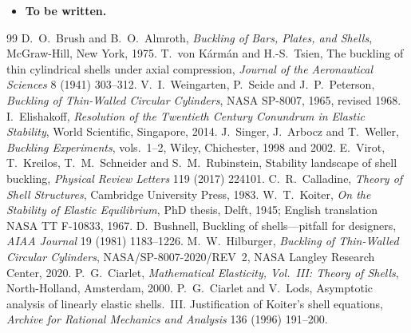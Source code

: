 \begin{gbox*}
\begin{itemize}
  \item \textbf{To be written.} 
\end{itemize}
\end{gbox*}

\label{sec:cy-exo}

\begin{chapterbib}{99}
 D.~O.~Brush and B.~O.~Almroth, \emph{Buckling of Bars, Plates, and Shells}, McGraw-Hill, New York, 1975.
 T.~von K\'arm\'an and H.-S.~Tsien, The buckling of thin cylindrical shells under axial compression, \emph{Journal of the Aeronautical Sciences} 8 (1941) 303--312.
 V.~I.~Weingarten, P.~Seide and J.~P.~Peterson, \emph{Buckling of Thin-Walled Circular Cylinders}, NASA SP-8007, 1965, revised 1968.
 I.~Elishakoff, \emph{Resolution of the Twentieth Century Conundrum in Elastic Stability}, World Scientific, Singapore, 2014.
 J.~Singer, J.~Arbocz and T.~Weller, \emph{Buckling Experiments}, vols.~1--2, Wiley, Chichester, 1998 and 2002.
 E.~Virot, T.~Kreilos, T.~M.~Schneider and S.~M.~Rubinstein, Stability landscape of shell buckling, \emph{Physical Review Letters} 119 (2017) 224101.
 C.~R.~Calladine, \emph{Theory of Shell Structures}, Cambridge University Press, 1983.
 W.~T.~Koiter, \emph{On the Stability of Elastic Equilibrium}, PhD thesis, Delft, 1945; English translation NASA TT F-10833, 1967.
 D.~Bushnell, Buckling of shells---pitfall for designers, \emph{AIAA Journal} 19 (1981) 1183--1226.
 M.~W.~Hilburger, \emph{Buckling of Thin-Walled Circular Cylinders}, NASA/SP-8007-2020/REV~2, NASA Langley Research Center, 2020.
 P.~G.~Ciarlet, \emph{Mathematical Elasticity, Vol.~III: Theory of Shells}, North-Holland, Amsterdam, 2000.
 P.~G.~Ciarlet and V.~Lods, Asymptotic analysis of linearly elastic shells.~III. Justification of Koiter's shell equations, \emph{Archive for Rational Mechanics and Analysis} 136 (1996) 191--200.
\end{chapterbib}
